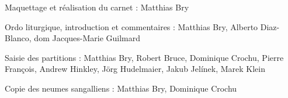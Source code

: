 \documentclass[10pt, twoside, openany, french]{book}
\begin{document}
\newpage\null
{}

\newpage

\null\thispagestyle{empty}

\vfill

Maquettage et réalisation du carnet : Matthias Bry

Ordo liturgique, introduction et commentaires : Matthias Bry, Alberto Diaz-Blanco, dom Jacques-Marie Guilmard

Saisie des partitions : Matthias Bry, Robert Bruce, Dominique Crochu, Pierre François, Andrew Hinkley, Jörg Hudelmaier, Jakub Jelínek, Marek Klein

Copie des neumes sangalliens : Matthias Bry, Dominique Crochu

\newpage
\setlength{\cftbeforetoctitleskip}{-2\baselineskip}
\tableofcontents
\thispagestyle{empty}
\end{document}
